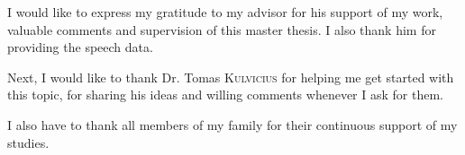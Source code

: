 
\begin{acknowledgements}
\vspace{1cm}
I would like to express my gratitude to my advisor \mbox{\supname} for his support of my work, valuable comments and supervision of this master thesis. I also thank him for providing the speech data.

Next, I would like to thank Dr. Tomas \textsc{Kulvicius} for helping me get started with this topic, for sharing his ideas and willing comments whenever I ask for them.

I also have to thank all members of my family for their continuous support of my studies.

\end{acknowledgements}